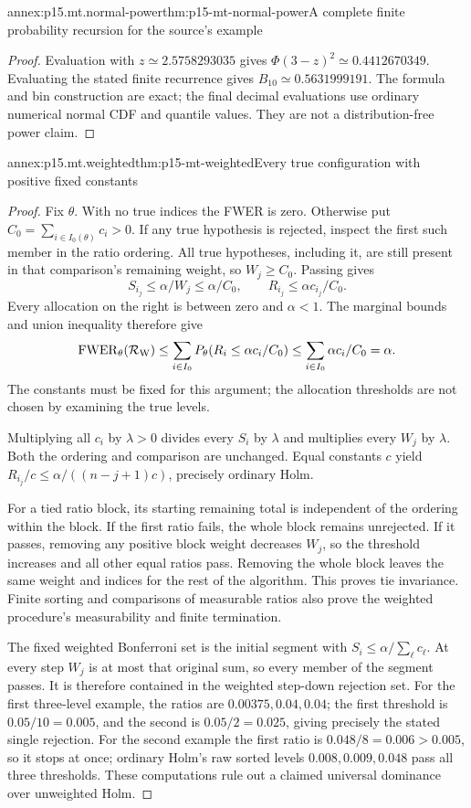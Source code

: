 \begin{annexitem}{annex:p15.mt.normal-power}{thm:p15-mt-normal-power}{A complete finite probability recursion for the source's example}
\begin{proof}
Evaluation with \(z\simeq2.5758293035\) gives
\(\Phi(3-z)^2\simeq0.4412670349\).
Evaluating the stated finite recurrence gives
\(B_{10}\simeq0.5631999191\). The formula and bin construction are
exact; the final decimal evaluations use ordinary numerical normal
CDF and quantile values. They are not a distribution-free power claim.
\end{proof}
\end{annexitem}

\begin{annexitem}{annex:p15.mt.weighted}{thm:p15-mt-weighted}{Every true configuration with positive fixed constants}
\begin{proof}
Fix \(\theta\). With no true indices the FWER is zero.
Otherwise put \(C_0=\sum_{i\in I_0(\theta)}c_i>0\).
If any true hypothesis is rejected, inspect the first such member in
the ratio ordering. All true hypotheses, including it, are still
present in that comparison's remaining weight, so \(W_j\geq C_0\).
Passing gives
\[
 S_{i_j}\leq\alpha/W_j\leq\alpha/C_0,\qquad
 R_{i_j}\leq\alpha c_{i_j}/C_0.
\]
Every allocation on the right is between zero and \(\alpha<1\).
The marginal bounds and union inequality therefore give
\[
 \operatorname{FWER}_\theta(\mathcal R_{\rm W})
 \leq\sum_{i\in I_0}P_\theta(R_i\leq\alpha c_i/C_0)
 \leq\sum_{i\in I_0}\alpha c_i/C_0=\alpha.
\]
The constants must be fixed for this argument; the allocation thresholds
are not chosen by examining the true levels.

Multiplying all \(c_i\) by \(\lambda>0\) divides every \(S_i\) by
\(\lambda\) and multiplies every \(W_j\) by \(\lambda\). Both the
ordering and comparison are unchanged. Equal constants \(c\) yield
\(R_{i_j}/c\leq\alpha/((n-j+1)c)\), precisely ordinary Holm.

For a tied ratio block, its starting remaining total is independent
of the ordering within the block. If the first ratio fails, the whole
block remains unrejected. If it passes, removing any positive block
weight decreases \(W_j\), so the threshold increases and all other
equal ratios pass. Removing the whole block leaves the same weight
and indices for the rest of the algorithm. This proves tie invariance.
Finite sorting and comparisons of measurable ratios also prove the
weighted procedure's measurability and finite termination.

The fixed weighted Bonferroni set is the initial segment with
\(S_i\leq\alpha/\sum_\ell c_\ell\). At every step \(W_j\) is at most
that original sum, so every member of the segment passes.
It is therefore contained in the weighted step-down rejection set.
For the first three-level example, the ratios are
\(0.00375,0.04,0.04\); the first threshold is \(0.05/10=0.005\),
and the second is \(0.05/2=0.025\), giving precisely the stated
single rejection. For the second example the first ratio is
\(0.048/8=0.006>0.005\), so it stops at once; ordinary Holm's raw
sorted levels \(0.008,0.009,0.048\) pass all three thresholds.
These computations rule out a claimed universal dominance over
unweighted Holm.


\end{proof}
\end{annexitem}
